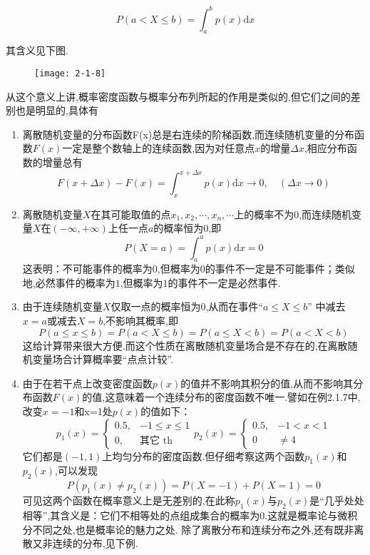 \[ 
P(a<X \leqslant b)=\int_{a}^{b} p(x) \mathrm{d} x
\]

其含义见下图.



\begin{figure}
	\centering
	\texttt{[image: 2-1-8]}
	\caption{}
	\label{fig:2-1-8}
\end{figure}

从这个意义上讲,概率密度函数与概率分布列所起的作用是类似的,但它们之间的差别也是明显的,具体有

\begin{enumerate}
	\item 离散随机变量的分布函数F(x)总是右连续的阶梯函数,而连续随机变量的分布函数$ F(x) $一定是整个数轴上的连续函数,因为对任意点$ x $的增量$\Delta x$,相应分布函数的增量总有
	\[ 
	F(x+\Delta x)-F(x)=\int_{x}^{x+\Delta x} p(x) \mathrm{d} x \longrightarrow 0, \quad(\Delta x \rightarrow 0)
	\]
	\item 离散随机变量$ X $在其可能取值的点$x_{1}, x_{2}, \cdots, x_{n}, \cdots$上的概率不为$ 0 $,而连续随机变量$ X $在$(-\infty,+\infty)$上任一点$ a $的概率恒为$ 0 $,即
	\[ 
	P(X=a)=\int_{a}^{a} p(x) \mathrm{d} x=0
	\]
	这表明：不可能事件的概率为$ 0 $,但概率为0的事件不一定是不可能事件；类似地,必然事件的概率为$ 1 $,但概率为$ 1 $的事件不一定是必然事件.
	\item 由于连续随机变量$ X $仅取一点的概率恒为$ 0 $,从而在事件“$a \leqslant X \leqslant b$”
	中减去$ x=a $或减去$ X=b $,不影响其概率,即
	\[ 
	P(a \leqslant x \leqslant b)=P(a<X \leqslant b)=P(a \leqslant X<b)=P(a<X<b)
	\]
	这给计算带来很大方便.而这个性质在离散随机变量场合是不存在的,在离散随机变量场合计算概率要“点点计较”.
	\item 由于在若干点上改变密度函数$ p(x) $的值并不影响其积分的值,从而不影响其分布函数$ F(x) $的值,这意味着一个连续分布的密度函数不唯一.譬如在例2.1.7中,改变$ x=-1 $和x=1处$ p(x) $的值如下：
	\[ 
	p_{1}(x)=\left\{\begin{array}{ll}{0.5,} & {-1 \leqslant x \leqslant 1} \\ {0,} & {\text{其它} \text { th }}\end{array}\right. p_{2}(x)=\left\{\begin{array}{ll}{0.5,} & {-1<x<1} \\ {0} & { \neq 4}\end{array}\right.
	\]
	它们都是$ (-1,1) $上均匀分布的密度函数.但仔细考察这两个函数$ p_1(x) $和$ p_2(x) $,可以发现
	\[ 
	P\left(p_{1}(x) \neq p_{2}(x)\right)=P(X=-1)+P(X=1)=0
	\]
	可见这两个函数在概率意义上是无差别的,在此称$ p_1(x) $与$ p_2(x) $是“几乎处处相等”,其含义是：它们不相等处的点组成集合的概率为$ 0 $.这就是概率论与微积分不同之处,也是概率论的魅力之处.
	除了离散分布和连续分布之外,还有既非离散又非连续的分布,见下例.
\end{enumerate}

